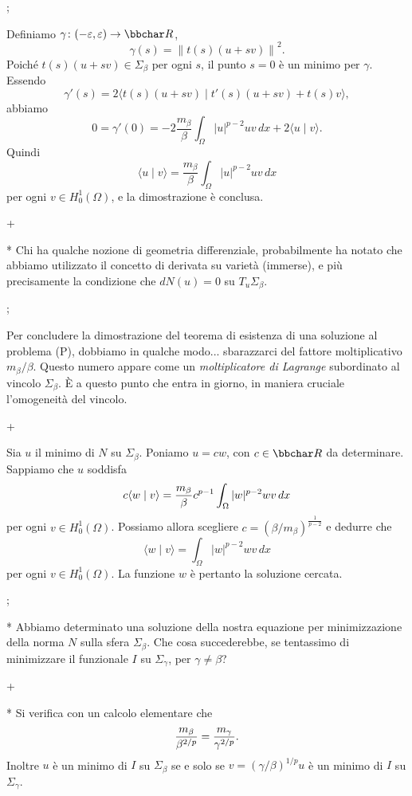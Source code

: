 \pg;

Definiamo $\gamma \colon (-\ge,\ge) \to \R$,
$$
\gamma(s) = \left\| t(s)(u+sv) \right\|^2.
$$
Poich\'e $t(s)(u+sv) \in \Sigma_\beta$ per ogni $s$, il punto $s=0$
\`e un minimo per $\gamma$. Essendo
$$
\gamma'(s) = 2 \langle t(s)(u+sv)\mid t'(s)(u+sv)+t(s)v \rangle,
$$
abbiamo
$$
0 = \gamma'(0)= -2 \frac{m_\beta}{\beta} \int_\Omega |u|^{p-2}uv\, dx+
2 \langle u\mid v \rangle.
$$
Quindi
$$
\langle u \mid v \rangle = \frac{m_\beta}{\beta} \int_\Omega
|u|^{p-2}uv \, dx
$$
per ogni $v \in H_0^1(\Omega)$, e la dimostrazione \`e conclusa.

\pg+

* Chi ha qualche nozione di geometria differenziale, probabilmente ha
  notato che abbiamo utilizzato il concetto di derivata su variet\`a
  (immerse), e pi\`u precisamente la condizione che $dN(u)=0$ su $T_u
  \Sigma_\beta$.

\pg;

Per concludere la dimostrazione del teorema di esistenza di una
soluzione al problema (P), dobbiamo in qualche modo... sbarazzarci del
fattore moltiplicativo $m_\beta/\beta$. Questo numero appare come un
{\em moltiplicatore di Lagrange} subordinato al vincolo
$\Sigma_\beta$. \`E a questo punto che entra in giorno, in maniera
cruciale l'omogeneit\`a del vincolo.

\pg+

Sia $u$ il minimo di $N$ su $\Sigma_\beta$. Poniamo $u=cw$, con $c \in
\R$ da determinare. Sappiamo che $u$ soddisfa
$$
c \langle w \mid v \rangle = {m_\beta \over \beta} c^{p-1} \int_\Omega
|w|^{p-2}wv\, dx
$$
per ogni $v \in H_0^1(\Omega)$. Possiamo allora scegliere
$c=(\beta/m_\beta)^{\frac{1}{p-2}}$ e dedurre che
$$
\langle w \mid v \rangle = \int_\Omega
|w|^{p-2}wv\, dx
$$
per ogni $v \in H_0^1(\Omega)$. La funzione $w$ \`e pertanto la
soluzione cercata.
 
\pg;

* Abbiamo determinato una soluzione della nostra equazione per
  minimizzazione della norma $N$ sulla sfera $\Sigma_\beta$. Che cosa
  succederebbe, se tentassimo di minimizzare il funzionale $I$ su
  $\Sigma_\gamma$, per $\gamma \neq \beta$?

\pg+

* Si verifica con un calcolo elementare che 
$$
{m_\beta \over \beta^{2/p}} = {m_\gamma \over \gamma^{2/p}}.$$
Inoltre $u$ \`e un minimo di $I$ su $\Sigma_\beta$ se e solo se
$v=(\gamma/\beta)^{1/p} u$ \`e un minimo di $I$ su $\Sigma_\gamma$.

